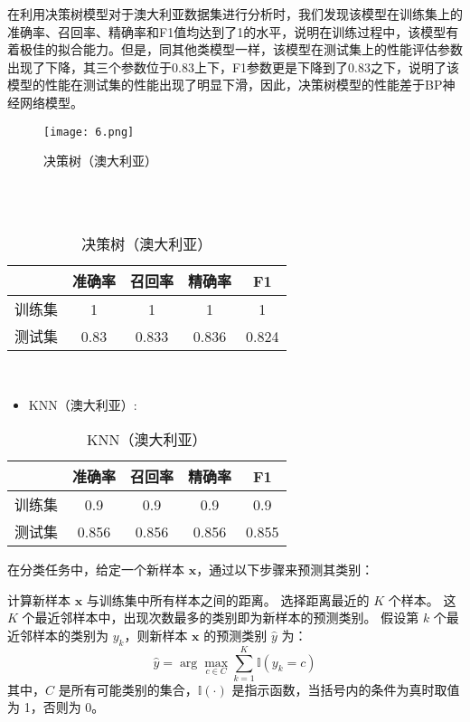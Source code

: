 \documentclass[12pt,a4paper]{nmmcm}
\begin{document}
在利用决策树模型对于澳大利亚数据集进行分析时，我们发现该模型在训练集上的准确率、召回率、精确率和F1值均达到了1的水平，说明在训练过程中，该模型有着极佳的拟合能力。但是，同其他类模型一样，该模型在测试集上的性能评估参数出现了下降，其三个参数位于0.83上下，F1参数更是下降到了0.83之下，说明了该模型的性能在测试集的性能出现了明显下滑，因此，决策树模型的性能差于BP神经网络模型。
\begin{figure}
    \centering
    \texttt{[image: 6.png]}
    \caption{决策树（澳大利亚）}
    \label{fig:enter-label}
\end{figure}
\\
\\
\begin{table}[H]
\centering
 \caption{决策树（澳大利亚）}
\begin{tabular}{ccccc}
\hline
 & 准确率   & 召回率   & 精确率   & F1    \\
\hline
训练集   & 1 & 1& 1& 1 \\
测试集   & 0.83& 0.833 & 0.836 & 0.824  \\
\hline
\end{tabular}
\end{table}

\\
\begin{itemize}
   \item
KNN（澳大利亚）:
\end{itemize}
\begin{table}[H]
\centering
 \caption{KNN（澳大利亚）}
\begin{tabular}{ccccc}
\hline
 & 准确率   & 召回率   & 精确率   & F1    \\
\hline
训练集   & 0.9 & 0.9& 0.9& 0.9 \\
测试集   & 0.856& 0.856 & 0.856 & 0.855  \\
\hline
\end{tabular}
\end{table}

在分类任务中，给定一个新样本 \( \mathbf{x} \)，通过以下步骤来预测其类别：

计算新样本 \( \mathbf{x} \) 与训练集中所有样本之间的距离。
选择距离最近的 \( K \) 个样本。
这 \( K \) 个最近邻样本中，出现次数最多的类别即为新样本的预测类别。
假设第 \( k \) 个最近邻样本的类别为 \( y_k \)，则新样本 \( \mathbf{x} \) 的预测类别 \( \hat{y} \) 为：
\[ \hat{y} = \arg\max_{c \in C} \sum_{k=1}^{K} \mathbb{I}(y_k = c) \]
其中，\( C \) 是所有可能类别的集合，\( \mathbb{I}(\cdot) \) 是指示函数，当括号内的条件为真时取值为 1，否则为 0。\\
\end{document}
